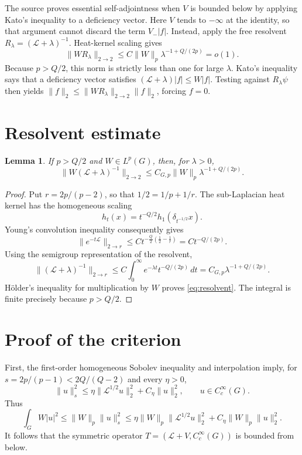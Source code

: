 \documentclass[11pt]{article}
\newtheorem{lemma}[theorem]{Lemma}
\newcommand{\Lcal}{\mathcal L}
\begin{document}
The source proves essential self-adjointness when $V$ is bounded below by
applying Kato's inequality to a deficiency vector.  Here $V$ tends to
$-\infty$ at the identity, so that argument cannot discard the term $V_-|f|$.
Instead, apply the free resolvent $R_\lambda=(\Lcal+\lambda)^{-1}$.  Heat-kernel
scaling gives
\[
 \|W R_\lambda\|_{2\to2}
 \leq C\|W\|_p\lambda^{-1+Q/(2p)}=o(1).
\]
Because $p>Q/2$, this norm is strictly less than one for large $\lambda$.
Kato's inequality says that a deficiency vector satisfies
$(\Lcal+\lambda)|f|\leq W|f|$.  Testing against $R_\lambda\psi$ then yields
$\|f\|_2\leq\|W R_\lambda\|_{2\to2}\|f\|_2$, forcing $f=0$.

\section{Resolvent estimate}

\begin{lemma}\label{lem:resolvent}
If $p>Q/2$ and $W\in L^p(G)$, then, for $\lambda>0$,
\begin{equation}\label{eq:resolvent}
 \|W(\Lcal+\lambda)^{-1}\|_{2\to2}
 \leq C_{G,p}\|W\|_p\lambda^{-1+Q/(2p)}.
\end{equation}
\end{lemma}

\begin{proof}
Put $r=2p/(p-2)$, so that $1/2=1/p+1/r$.  The sub-Laplacian heat kernel has
the homogeneous scaling
\[
 h_t(x)=t^{-Q/2}h_1(\delta_{t^{-1/2}}x).
\]
Young's convolution inequality consequently gives
\[
 \|e^{-t\Lcal}\|_{2\to r}
 \leq C t^{-\frac Q2(\frac12-\frac1r)}
 =C t^{-Q/(2p)}.
\]
Using the semigroup representation of the resolvent,
\[
 \|(\Lcal+\lambda)^{-1}\|_{2\to r}
 \leq C\int_0^\infty e^{-\lambda t}t^{-Q/(2p)}\,dt
 =C_{G,p}\lambda^{-1+Q/(2p)}.
\]
H\"older's inequality for multiplication by $W$ proves
\eqref{eq:resolvent}.  The integral is finite precisely because $p>Q/2$.
\end{proof}

\section{Proof of the criterion}

First, the first-order homogeneous Sobolev inequality and interpolation imply,
for $s=2p/(p-1)<2Q/(Q-2)$ and every $\eta>0$,
\[
 \|u\|_s^2
 \leq \eta\|\Lcal^{1/2}u\|_2^2+C_\eta\|u\|_2^2,
 \qquad u\in C_c^\infty(G).
\]
Thus
\[
 \int_G W|u|^2
 \leq\|W\|_p\|u\|_s^2
 \leq \eta\|W\|_p\|\Lcal^{1/2}u\|_2^2
      +C_\eta\|W\|_p\|u\|_2^2.
\]
It follows that the symmetric operator
$T=(\Lcal+V,C_c^\infty(G))$ is bounded from below.
\end{document}
